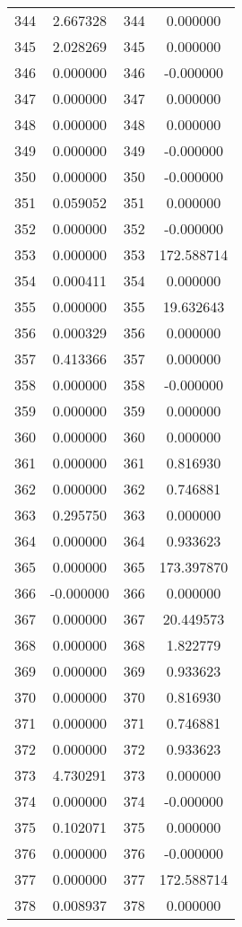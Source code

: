 \documentclass[12pt]{article}
\begin{document}
\begin{longtable}{@{}cccc@{}}
344 & 2.667328 & 344 & 0.000000 \\
345 & 2.028269 & 345 & 0.000000 \\
346 & 0.000000 & 346 & -0.000000 \\
347 & 0.000000 & 347 & 0.000000 \\
348 & 0.000000 & 348 & 0.000000 \\
349 & 0.000000 & 349 & -0.000000 \\
350 & 0.000000 & 350 & -0.000000 \\
351 & 0.059052 & 351 & 0.000000 \\
352 & 0.000000 & 352 & -0.000000 \\
353 & 0.000000 & 353 & 172.588714 \\
354 & 0.000411 & 354 & 0.000000 \\
355 & 0.000000 & 355 & 19.632643 \\
356 & 0.000329 & 356 & 0.000000 \\
357 & 0.413366 & 357 & 0.000000 \\
358 & 0.000000 & 358 & -0.000000 \\
359 & 0.000000 & 359 & 0.000000 \\
360 & 0.000000 & 360 & 0.000000 \\
361 & 0.000000 & 361 & 0.816930 \\
362 & 0.000000 & 362 & 0.746881 \\
363 & 0.295750 & 363 & 0.000000 \\
364 & 0.000000 & 364 & 0.933623 \\
365 & 0.000000 & 365 & 173.397870 \\
366 & -0.000000 & 366 & 0.000000 \\
367 & 0.000000 & 367 & 20.449573 \\
368 & 0.000000 & 368 & 1.822779 \\
369 & 0.000000 & 369 & 0.933623 \\
370 & 0.000000 & 370 & 0.816930 \\
371 & 0.000000 & 371 & 0.746881 \\
372 & 0.000000 & 372 & 0.933623 \\
373 & 4.730291 & 373 & 0.000000 \\
374 & 0.000000 & 374 & -0.000000 \\
375 & 0.102071 & 375 & 0.000000 \\
376 & 0.000000 & 376 & -0.000000 \\
377 & 0.000000 & 377 & 172.588714 \\
378 & 0.008937 & 378 & 0.000000 \\

\end{longtable}
\end{document}
